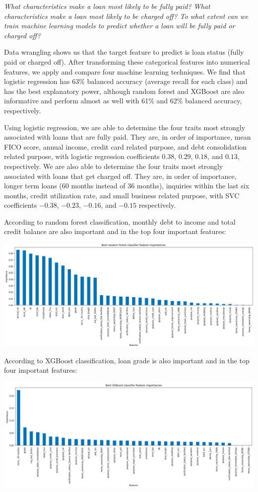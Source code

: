\documentclass[11pt]{article}
\begin{document}
\begin{flushleft}
{\em What characteristics make a loan most likely to be fully paid?
What characteristics make a loan most likely to be charged off?
To what extent can we train machine learning models to predict whether a	loan will be fully paid or charged off?}
\end{flushleft}

Data wrangling shows us that the target feature to predict is loan status
(fully paid or charged off). After transforming these categorical features
into numerical features, we apply and compare four machine learning techniques.
We find that logistic regression has 63\% balanced accuracy (average recall for
each class) and has the best explanatory power, although random forest and
XGBoost are also informative and perform almost as well with 61\% and 62\%
balanced accuracy, respectively.

Using logistic regression, we are able to determine the four traits most
strongly associated with loans that are fully paid. They are, in order of
importance, mean FICO score, annual income, credit card related purpose,
and debt consolidation related purpose, with logistic regression coefficients
$0.38$, $0.29$, $0.18$, and $0.13$, respectively.
We are also able to determine the four traits most strongly
associated with loans that get charged off. They are, in order of importance,
longer term loans (60 months instead of 36 months), inquiries within the last
six months, credit utilization rate, and small business related purpose,
with SVC coefficients $-0.38$, $-0.23$, $-0.16$, and $-0.15$ respectively.

According to random forest classification, monthly debt to income and total
credit balance are also important and in the top four important features:
\begin{center}
\includegraphics[scale=0.35]{random-forest-feature-importances.png}
\end{center}
According to XGBoost classification, loan grade is also important and in the
top four important features:
\begin{center}
\includegraphics[scale=0.35]{xgboost-feature-importances.png}
\end{center}
\end{document}
